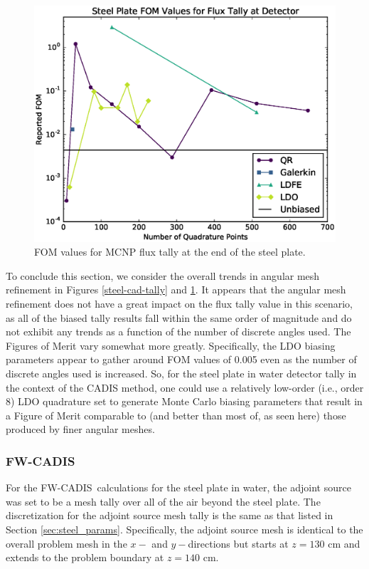 \documentclass{article} %
\newcommand{\fwc}{\mbox{FW-CADIS}}
\begin{document}
\begin{figure}[!htb]
\centering
\includegraphics[max height=0.445\textheight]{img/steel-cadis-fom.eps}
\caption{FOM values for MCNP flux tally at the end of the steel plate.}
\label{steel-cad-fom}
\end{figure}

To conclude this section, we consider the overall trends in angular mesh
refinement in Figures \ref{steel-cad-tally} and \ref{steel-cad-fom}. It
appears that the angular mesh refinement does not have a great impact on the
flux tally value in this scenario, as all of the biased tally results fall
within the same order of magnitude and do not exhibit any trends as a function
of the number of discrete angles used. The Figures of Merit vary somewhat
more greatly. Specifically, the LDO biasing parameters appear to gather around
FOM values of 0.005 even as the number of discrete angles used is increased.
So, for the steel plate in water detector tally in the context of the CADIS
method, one could use a relatively low-order (i.e., order 8) LDO quadrature
set to generate Monte Carlo biasing parameters that result in a Figure of
Merit comparable to (and better than most of, as seen here) those produced by
finer angular meshes.

\FloatBarrier
\subsubsection{\fwc}

For the \fwc\ calculations for the steel plate in water, the adjoint source was
set to be a mesh tally over all of the air beyond the steel plate. The
discretization for the adjoint source mesh tally is the same as that listed in 
Section \ref{sec:steel_params}. Specifically, the adjoint source mesh is
identical to the overall problem mesh in the $x-$ and $y-$directions but starts
at $z = 130$ cm and extends to the problem boundary at $z = 140$ cm.
\end{document}
